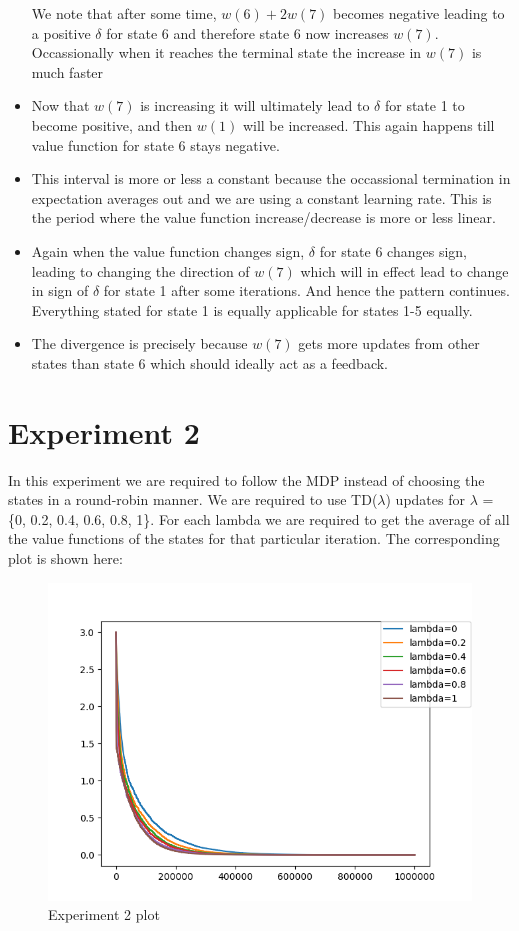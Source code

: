 \documentclass{article}
\begin{document}
\begin{itemize}
  We note that after some time, $w(6) + 2w(7)$ becomes negative leading to a positive $\delta$ for state 6 and therefore state 6 now increases $w(7)$. Occassionally when it reaches the terminal state the increase in $w(7)$ is much faster
\item Now that $w(7)$ is increasing it will ultimately lead to $\delta$ for state 1 to become positive, and then $w(1)$ will be increased. This again happens till value function for state 6 stays negative.
\item This interval is more or less a constant because the occassional termination in expectation averages out and we are using a constant learning rate. This is the period where the value function increase/decrease is more or less linear.
\item Again when the value function changes sign, $\delta$ for state 6 changes sign, leading to changing the direction of $w(7)$ which will in effect lead to change in sign of $\delta$ for state 1 after some iterations. And hence the pattern continues. Everything stated for state 1 is equally applicable for states 1-5 equally.
\item The divergence is precisely because $w(7)$ gets  more updates from other states than state 6 which should ideally act as a feedback.
\end{itemize}

\section{Experiment 2}
In this experiment we are required to follow the MDP instead of choosing the states in a round-robin manner. We are required to use TD($\lambda$) updates for $\lambda$ = \{0, 0.2, 0.4, 0.6, 0.8, 1\}. For each lambda we are required to get the average of all the value functions of the states for that particular iteration. The corresponding plot is shown here:
\begin{figure}[H]
  \centering
  \includegraphics[scale=0.5]{images/exp2}
  \caption{Experiment 2 plot}
  \label{fig:ex2}
\end{figure}
\end{document}
